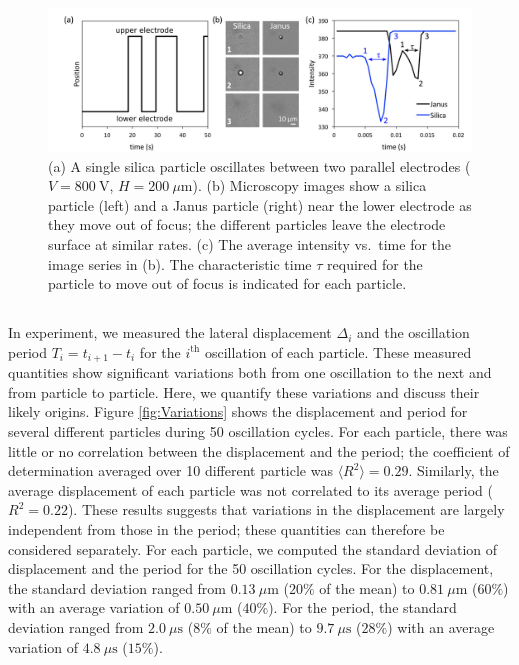 \begin{appendices}
\begin{figure}[h]
    \centering
    \includegraphics[width=\textwidth]{figures/A1_SilicaParticles.png}
    \caption{(a) A single silica particle oscillates between two parallel electrodes ($V=800~\text{V}$, $H=200~\mu\text{m}$). (b) Microscopy images show a silica particle (left) and a Janus particle (right) near the lower electrode as they move out of focus; the different particles leave the electrode surface at similar rates. (c) The average intensity vs.~time for the image series in (b). The characteristic time $\tau$ required for the particle to move out of focus is indicated for each particle.}
    \label{fig:Silica}
\end{figure}


\subsection{}

In experiment, we measured the lateral displacement $\Delta_i$ and the oscillation period $T_i=t_{i+1}-t_{i}$ for the $i^{\text{th}}$ oscillation of each particle.
These measured quantities show significant variations both from one oscillation to the next and from particle to particle. 
Here, we quantify these variations and discuss their likely origins.
Figure \ref{fig:Variations} shows the displacement and period for several different particles during 50 oscillation cycles.
For each particle, there was little or no correlation between the displacement and the period; the coefficient of determination averaged over 10 different particle was $\langle R^2\rangle=0.29$.
Similarly, the average displacement of each particle was not correlated to its average period ($R^2 = 0.22$).
These results suggests that variations in the displacement are largely independent from those in the period; these quantities can therefore be considered separately.
For each particle, we computed the standard deviation of displacement and the period for the 50 oscillation cycles.
For the displacement, the standard deviation ranged from $0.13~\mu\text{m}$ ($20\%$ of the mean) to $0.81~\mu\text{m}$ ($60\%$) with an average variation of $0.50~\mu\text{m}$ ($40\%$).
For the period, the standard deviation ranged from $2.0~\mu\text{s}$ ($8\%$ of the mean) to $9.7~\mu\text{s}$ ($28\%$) with an average variation of $4.8~\mu\text{s}$ ($15\%$).


\end{appendices}
